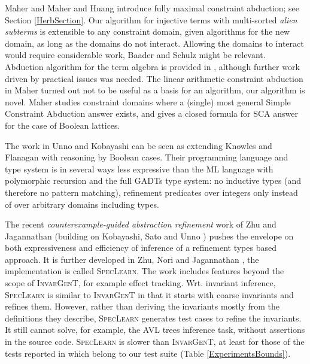 \documentclass{article}
\newcommand{\tmem}[1]{{\em #1\/}}
\newcommand{\tmname}[1]{\textsc{#1}}
\begin{document}
Maher {\cite{AbductionMaher}} and Maher and Huang {\cite{AbductionSolvMaher}}
introduce fully maximal constraint abduction; see Section \ref{HerbSection}.
Our algorithm for injective terms with multi-sorted {\tmem{alien subterms}} is
extensible to any constraint domain, given algorithms for the new domain, as
long as the domains do not interact. Allowing the domains to interact would
require considerable work, Baader and Schulz {\cite{UnificationBaader}} might
be relevant. Abduction algorithm for the term algebra is provided in
{\cite{AbductionSolvMaher}}, although further work driven by practical issues
was needed. The linear arithmetic constraint abduction in Maher
{\cite{AbductionLinArithMaher}} turned out not to be useful as a basis for an
algorithm, our algorithm is novel. Maher {\cite{HeytingAbdMaher}} studies
constraint domains where a (single) most general Simple Constraint Abduction
answer exists, and gives a closed formula for SCA answer for the case of
Boolean lattices.

The work in Unno and Kobayashi {\cite{InterpolationInfer}} can be seen as
extending Knowles and Flanagan {\cite{KnowlesF07}} with reasoning by Boolean
cases. Their programming language and type system is in several ways less
expressive than the ML language with polymorphic recursion and the full GADTs
type system: no inductive types (and therefore no pattern matching),
refinement predicates over integers only instead of over arbitrary domains
including types.

The recent {\tmem{counterexample-guided abstraction refinement}} work of Zhu
and Jagannathan {\cite{LightDML}} (building on Kobayashi, Sato and Unno
{\cite{CEGAR}}) pushes the envelope on both expressiveness and efficiency of
inference of a refinement types based approach. It is further developed in
Zhu, Nori and Jagannathan {\cite{SpecLearnArrays}}, the implementation is
called {\tmname{SpecLearn}}. The work includes features beyond the scope of
{\tmname{InvarGenT}}, for example effect tracking. Wrt. invariant inference,
{\tmname{SpecLearn}} is similar to {\tmname{InvarGenT}} in that it starts with
coarse invariants and refines them. However, rather than deriving the
invariants mostly from the definitions they describe, {\tmname{SpecLearn}}
generates test cases to refine the invariants. It still cannot solve, for
example, the AVL trees inference task, without assertions in the source code.
{\tmname{SpecLearn}} is slower than {\tmname{InvarGenT}}, at least for those
of the tests reported in {\cite{SpecLearnArrays}} which belong to our test
suite (Table \ref{ExperimentsBounds}).
\end{document}
